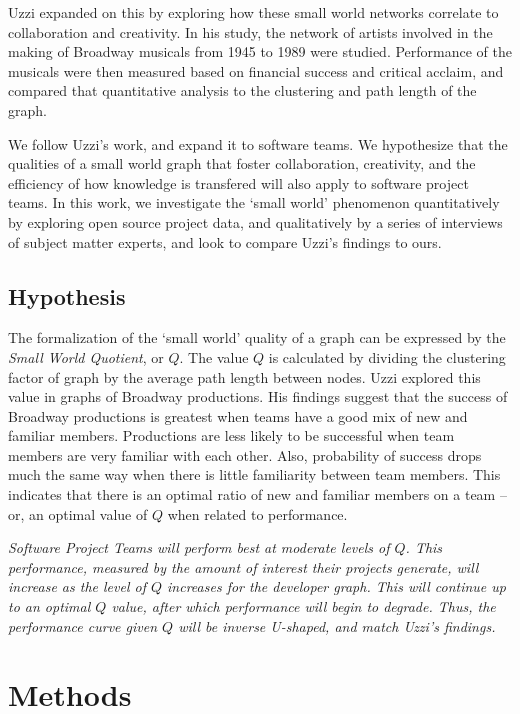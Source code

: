 \documentclass{proc}
\begin{document}
Uzzi \cite{uzzi2005collaboration} expanded on this by exploring how these small world networks correlate to collaboration and creativity. In his study, the network of artists involved in the making of Broadway musicals from 1945 to 1989 were studied. Performance of the musicals were then measured based on financial success and critical acclaim, and compared that quantitative analysis to the clustering and path length of the graph.

We follow Uzzi's work, and expand it to software teams. We hypothesize that the qualities of a small world graph that foster collaboration, creativity, and the efficiency of how knowledge is transfered\cite{latora2001efficient} will also apply to software project teams. In this work, we investigate the `small world' phenomenon quantitatively by exploring open source project data, and qualitatively by a series of interviews of subject matter experts, and look to compare Uzzi's findings to ours.


\subsection{Hypothesis}
The formalization of the `small world' quality of a graph can be expressed by the \textit{Small World Quotient}, or $Q$\cite{watts1999small,watts1998collective}. The value $Q$ is calculated by dividing the clustering factor of graph by the average path length between nodes. Uzzi explored this value in graphs of Broadway productions\cite{uzzi2005collaboration}. His findings suggest that the success of Broadway productions is greatest when teams have a good mix of new and familiar members. Productions are less likely to be successful when team members are very familiar with each other. Also, probability of success drops much the same way when there is little familiarity between team members. This indicates that there is an optimal ratio of new and familiar members on a team -- or, an optimal value of $Q$ when related to performance.

\textit{Software Project Teams will perform best at moderate levels of $Q$. This performance, measured by the amount of interest their projects generate, will increase as the level of $Q$ increases for the developer graph. This will continue up to an optimal $Q$ value, after which performance will begin to degrade. Thus, the performance curve given $Q$ will be inverse U-shaped, and match Uzzi's findings\cite{uzzi2005collaboration}.}

\section{Methods}
\end{document}
